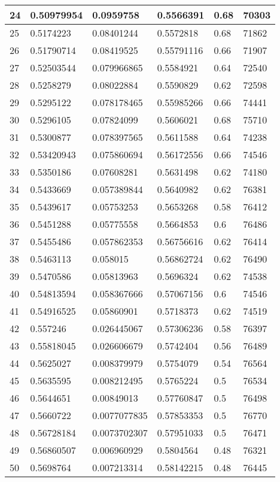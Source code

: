 \begin{longtable}{|l|l|l|l|l|l|}
24 & 0.50979954 & 0.0959758 & 0.5566391 & 0.68 & 70303 \\ \hline 
25 & 0.5174223 & 0.08401244 & 0.5572818 & 0.68 & 71862 \\ \hline 
26 & 0.51790714 & 0.08419525 & 0.55791116 & 0.66 & 71907 \\ \hline 
27 & 0.52503544 & 0.079966865 & 0.5584921 & 0.64 & 72540 \\ \hline 
28 & 0.5258279 & 0.08022884 & 0.5590829 & 0.62 & 72598 \\ \hline 
29 & 0.5295122 & 0.078178465 & 0.55985266 & 0.66 & 74441 \\ \hline 
30 & 0.5296105 & 0.07824099 & 0.5606021 & 0.68 & 75710 \\ \hline 
31 & 0.5300877 & 0.078397565 & 0.5611588 & 0.64 & 74238 \\ \hline 
32 & 0.53420943 & 0.075860694 & 0.56172556 & 0.66 & 74546 \\ \hline 
33 & 0.5350186 & 0.07608281 & 0.5631498 & 0.62 & 74180 \\ \hline 
34 & 0.5433669 & 0.057389844 & 0.5640982 & 0.62 & 76381 \\ \hline 
35 & 0.5439617 & 0.05753253 & 0.5653268 & 0.58 & 76412 \\ \hline 
36 & 0.5451288 & 0.05775558 & 0.5664853 & 0.6 & 76486 \\ \hline 
37 & 0.5455486 & 0.057862353 & 0.56756616 & 0.62 & 76414 \\ \hline 
38 & 0.5463113 & 0.058015 & 0.56862724 & 0.62 & 76490 \\ \hline 
39 & 0.5470586 & 0.05813963 & 0.5696324 & 0.62 & 74538 \\ \hline 
40 & 0.54813594 & 0.058367666 & 0.57067156 & 0.6 & 74546 \\ \hline 
41 & 0.54916525 & 0.05860901 & 0.5718373 & 0.62 & 74519 \\ \hline 
42 & 0.557246 & 0.026445067 & 0.57306236 & 0.58 & 76397 \\ \hline 
43 & 0.55818045 & 0.026606679 & 0.5742404 & 0.56 & 76489 \\ \hline 
44 & 0.5625027 & 0.008379979 & 0.5754079 & 0.54 & 76564 \\ \hline 
45 & 0.5635595 & 0.008212495 & 0.5765224 & 0.5 & 76534 \\ \hline 
46 & 0.5644651 & 0.00849013 & 0.57760847 & 0.5 & 76498 \\ \hline 
47 & 0.5660722 & 0.0077077835 & 0.57853353 & 0.5 & 76770 \\ \hline 
48 & 0.56728184 & 0.0073702307 & 0.57951033 & 0.5 & 76471 \\ \hline 
49 & 0.56860507 & 0.006960929 & 0.5804564 & 0.48 & 76321 \\ \hline 
50 & 0.5698764 & 0.007213314 & 0.58142215 & 0.48 & 76445 \\ \hline 
\end{longtable}